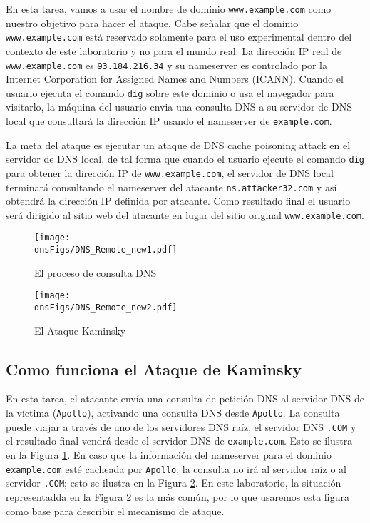 En esta tarea, vamos a usar el nombre de dominio {\tt www.example.com} como nuestro objetivo para hacer el ataque. Cabe señalar que el dominio {\tt www.example.com} está reservado solamente para el uso experimental dentro del contexto de este laboratorio y no para el mundo real. La dirección IP real de {\tt www.example.com} es {\tt 93.184.216.34} y su nameserver es controlado por la Internet Corporation for Assigned Names and Numbers (ICANN).
Cuando el usuario ejecuta el comando {\tt dig} sobre este dominio o usa el navegador para visitarlo, la máquina del usuario envia una consulta DNS a su servidor de DNS local que consultará la dirección IP usando el nameserver de {\tt example.com}.

La meta del ataque es ejecutar un ataque de DNS cache poisoning attack en el servidor de DNS local, de tal forma que cuando el usuario ejecute el comando {\tt dig} para obtener la dirección IP de {\tt www.example.com}, el servidor de DNS local terminará consultando el nameserver del atacante {\tt ns.attacker32.com} y así obtendrá la dirección IP definida por atacante. Como resultado final el usuario será dirigido al sitio web del atacante en lugar del sitio original {\tt www.example.com}.



\begin{figure}[htb]
\centering
\texttt{[image: \\dnsFigs/DNS\_Remote\_new1.pdf]}
\caption{El proceso de consulta DNS} 
\label{fig:flow_diagram1}
\end{figure}


\begin{figure}[htb]
\centering
\texttt{[image: \\dnsFigs/DNS\_Remote\_new2.pdf]}
\caption{El Ataque Kaminsky}
\label{fig:flow_diagram2}
\end{figure}



\subsection{Como funciona el Ataque de Kaminsky}

En esta tarea, el atacante envía una consulta de petición DNS al servidor DNS de la víctima ({\tt Apollo}), activando una consulta DNS desde {\tt Apollo}.
La consulta puede viajar a través de uno de los servidores DNS raíz, el servidor DNS {\tt .COM} y el resultado final vendrá desde el servidor DNS de {\tt example.com}. Esto se ilustra en la Figura \ref{fig:flow_diagram1}. En caso que la información del nameserver para el dominio {\tt example.com} esté cacheada por {\tt Apollo}, la consulta no irá al servidor raíz o al servidor {\tt .COM}; esto se ilustra en la Figura \ref{fig:flow_diagram2}.
En este laboratorio, la situación representadda en la Figura \ref{fig:flow_diagram2} es la más común, por lo que usaremos esta figura como base para describir el mecanismo de ataque.

